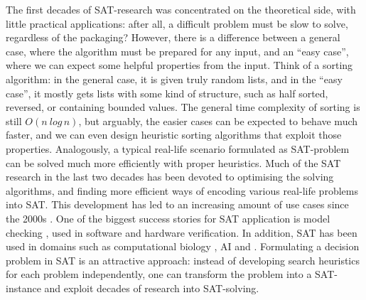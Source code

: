 The first decades of SAT-research was concentrated on the theoretical side, with little practical applications: 
after all, a difficult problem must be slow to solve, regardless of the packaging? 
However, there is a difference between a general case, where the algorithm must be prepared for any input, and an ``easy case'', where we can expect some helpful properties from the input.
Think of a sorting algorithm: in the general case, it is given truly random lists, and in the ``easy case'', it mostly gets lists with some kind of structure, such as half sorted, reversed, or containing bounded values. The general time complexity of sorting is still $O(n\ log\, n)$, but arguably, the easier cases can be expected to behave much faster, and we can even design heuristic sorting algorithms that exploit those properties.
Analogously, a typical real-life scenario formulated as SAT-problem can be solved much more efficiently with proper heuristics. 
Much of the SAT research in the last two decades has been devoted to optimising the solving algorithms, and finding more efficient ways of encoding various real-life problems into SAT.
This development has led to an increasing amount of use cases since the 2000s \cite{claessen2009satpractice}.
One of the biggest success stories for SAT application is model checking , used in software and hardware verification. In addition, SAT has been used in domains such as computational biology , AI  and .
Formulating a decision problem in SAT is an attractive approach: instead of developing search heuristics for each problem independently, one can transform the problem into a SAT-instance and exploit decades of research into SAT-solving. 

